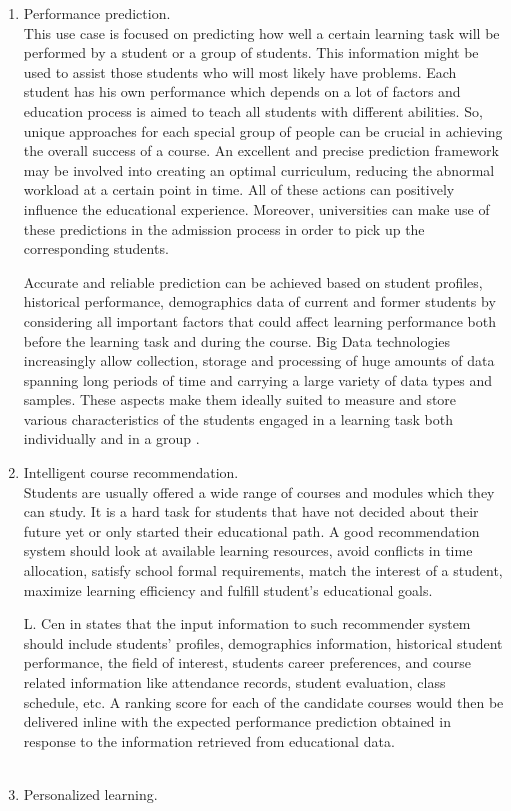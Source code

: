 \documentclass[runningheads]{llncs}
\begin{document}
\begin{enumerate}
\item Performance prediction.\\

This use case is focused on predicting how well a certain learning task will be performed by a student or a group of students. This information might be used to assist those students who will most likely have problems. Each student has his own performance which depends on a lot of factors and education process is aimed to teach all students with different abilities. So, unique approaches for each special group of people can be crucial in achieving the overall success of a course. An excellent and precise prediction framework may be involved into creating an optimal curriculum, reducing the abnormal workload at a certain point in time. All of these actions can positively influence the educational experience. Moreover, universities can make use of these predictions in the admission process in order to pick up the corresponding students.

Accurate and reliable prediction can be achieved based on student profiles, historical performance, demographics data of current and former students by considering all important factors that could affect learning performance both before the learning task and during the course. Big Data technologies increasingly allow collection, storage and processing of huge amounts of data spanning long periods of time and carrying a large variety of data types and samples. These aspects make them ideally suited to measure and store various characteristics of the students engaged in a learning task both individually and in a group \cite{EDUCATIONOPPORTUNITIES}.\\

\item Intelligent course recommendation.\\

Students are usually offered a wide range of courses and modules which they can study. It is a hard task for students that have not decided about their future yet or only started their educational path. A good recommendation system should look at available learning resources, avoid conflicts in time allocation, satisfy school formal requirements, match the interest of a student, maximize learning efficiency and fulfill student's educational goals.

L. Cen in \cite{EDUCATIONOPPORTUNITIES} states that the input information to such recommender system should include students' profiles, demographics information, historical student performance, the field of interest, students career preferences, and course related information like attendance records, student evaluation,
class schedule, etc. A ranking score for each of the candidate courses would then be delivered inline with the expected performance prediction obtained in response to the information retrieved from educational data.\\
\\
\item Personalized learning.\\


\end{enumerate}
\end{document}
